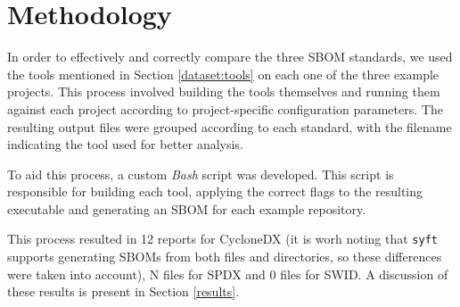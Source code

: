 \section{Methodology}

In order to effectively and correctly compare the three SBOM standards, we used the tools mentioned in Section \ref{dataset:tools} on each one of the three example projects. This process involved building the tools themselves and running them against each project according to project-specific configuration parameters. The resulting output files were grouped according to each standard, with the filename indicating the tool used for better analysis.

To aid this process, a custom \emph{Bash} script was developed. This script is responsible for building each tool, applying the correct flags to the resulting executable and generating an SBOM for each example repository.

This process resulted in 12 reports for CycloneDX (it is worh noting that \verb|syft| supports generating SBOMs from both files and directories, so these differences were taken into account), N files for SPDX and 0 files for SWID. A discussion of these results is present in Section \ref{results}.